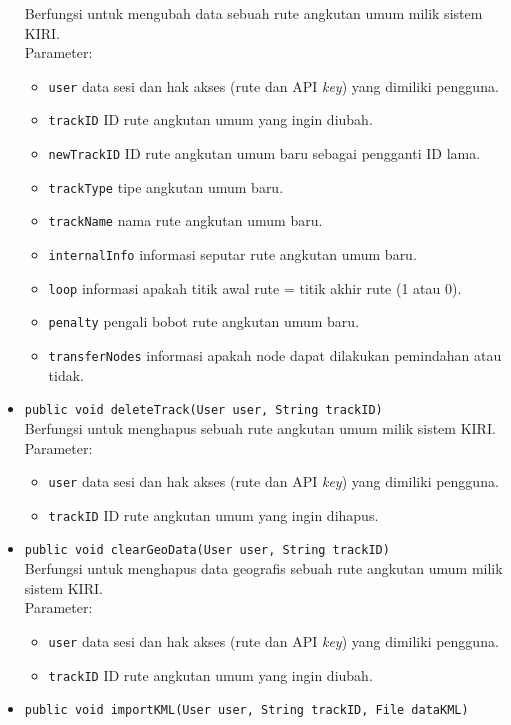 \begin{itemize}
	Berfungsi untuk mengubah data sebuah rute angkutan umum milik sistem KIRI.\\
	Parameter:
	\begin{itemize}
		\item \texttt{user} data sesi dan hak akses (rute dan API \textit{key}) yang dimiliki pengguna.
		\item \texttt{trackID} ID rute angkutan umum yang ingin diubah.
		\item \texttt{newTrackID} ID rute angkutan umum baru sebagai pengganti ID lama.
		\item \texttt{trackType} tipe angkutan umum baru.
		\item \texttt{trackName} nama rute angkutan umum baru.
		\item \texttt{internalInfo} informasi seputar rute angkutan umum baru.
		\item \texttt{loop} informasi apakah titik awal rute = titik akhir rute (1 atau 0).
		\item \texttt{penalty} pengali bobot rute angkutan umum baru.
		\item \texttt{transferNodes} informasi apakah node dapat dilakukan pemindahan atau tidak.
	\end{itemize}
	\item \texttt{public void deleteTrack(User user, String trackID)}\\
	Berfungsi untuk menghapus sebuah rute angkutan umum milik sistem KIRI.\\
	Parameter:
	\begin{itemize}
		\item \texttt{user} data sesi dan hak akses (rute dan API \textit{key}) yang dimiliki pengguna.
		\item \texttt{trackID} ID rute angkutan umum yang ingin dihapus.
	\end{itemize}
	\item \texttt{public void clearGeoData(User user, String trackID)}\\
	Berfungsi untuk menghapus data geografis sebuah rute angkutan umum milik sistem KIRI.\\
	Parameter:
	\begin{itemize}
		\item \texttt{user} data sesi dan hak akses (rute dan API \textit{key}) yang dimiliki pengguna.
		\item \texttt{trackID} ID rute angkutan umum yang ingin diubah.
	\end{itemize}
	\item \texttt{public void importKML(User user, String trackID, File dataKML)}\\

\end{itemize}
